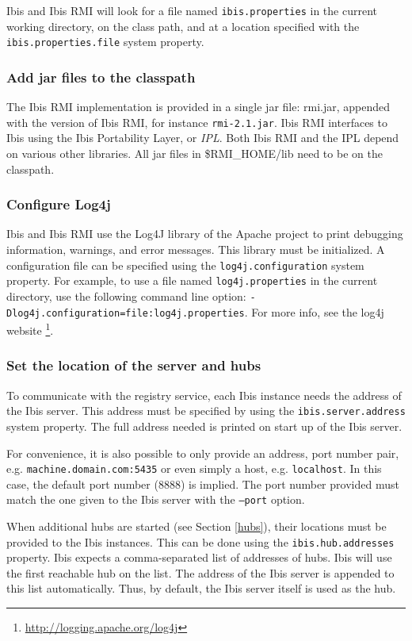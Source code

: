 \documentclass[a4paper,10pt]{article}
\begin{document}
Ibis and Ibis RMI will look for a file named \texttt{ibis.properties} in the
current working directory, on the class path, and at a location specified
with the \texttt{ibis.properties.file} system property.

\subsubsection{Add jar files to the classpath}

The Ibis RMI implementation is provided in a single jar file: rmi.jar,
appended with the version of Ibis RMI, for instance \texttt{rmi-2.1.jar}.
Ibis RMI interfaces to Ibis using the Ibis Portability Layer, or
\emph{IPL}. Both Ibis RMI and the IPL depend on various other libraries.
All jar files in \$RMI\_HOME/lib need to be on the classpath.

\subsubsection{Configure Log4j}

Ibis and Ibis RMI use the Log4J library of the Apache project to print debugging
information, warnings, and error messages. This library must be
initialized. A configuration file can be specified using the
\texttt{log4j.configuration} system property. For example, to use a file
named \texttt{log4j.properties} in the current directory, use the
following command line option:
\texttt{-Dlog4j.configuration=file:log4j.properties}. For more info,
see the log4j website \footnote{\url{http://logging.apache.org/log4j}}.

\subsubsection{Set the location of the server and hubs}

To communicate with the registry service, each Ibis instance needs the address
of the Ibis server. This address must be specified by using the
\texttt{ibis.server.address} system property. The full address needed is
printed on start up of the Ibis server.

For convenience, it is also possible to only provide an address, port number
pair, e.g. \texttt{machine.domain.com:5435} or even simply a host, e.g.
\texttt{localhost}. In this case, the default port number (8888) is implied.
The port number provided must match the one given to the Ibis server
with the \texttt{--port} option.

When additional hubs are started (see Section \ref{hubs}), their locations
must be provided to the Ibis instances. This can be done using
the \texttt{ibis.hub.addresses} property. Ibis expects a comma-separated
list of addresses of hubs. Ibis will use the first reachable hub on the
list. The address of the Ibis server is appended to this list
automatically. Thus, by default, the Ibis server itself is used as the
hub.
\end{document}
